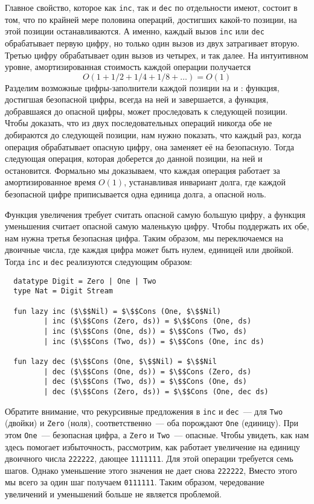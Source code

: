 Главное свойство, которое как \lstinline!inc!, так и \lstinline!dec!
по отдельности имеют, состоит в том, что по крайней мере половина
операций, достигших какой-то позиции, на этой позиции
останавливаются. А именно, каждый вызов \lstinline!inc! или
\lstinline!dec! обрабатывает первую цифру, но только один вызов из
двух затрагивает вторую. Третью цифру обрабатывает один вызов из
четырех, и так далее. На интуитивном уровне, амортизированная
стоимость каждой операции получается
$$
O(1 + 1/2 + 1/4 + 1/8 + \ldots) = O(1)
$$
Разделим возможные цифры-заполнители каждой позиции на
 и : функция,
достигшая безопасной цифры, всегда на ней и завершается, а функция,
добравшаяся до опасной цифры, может проследовать к следующей
позиции. Чтобы доказать, что из двух последовательных операций никогда
обе не добираются до следующей позиции, нам нужно показать, что каждый
раз, когда операция обрабатывает опасную цифру, она заменяет её на
безопасную. Тогда следующая операция, которая доберется до данной
позиции, на ней и остановится. Формально мы доказываем, что каждая
операция работает за амортизированное время $O(1)$, устанавливая
инвариант долга, где каждой безопасной цифре приписывается одна
единица долга, а опасной ноль.

Функция увеличения требует считать опасной самую большую цифру, а
функция уменьшения считает опасной самую маленькую цифру. Чтобы
поддержать их обе, нам нужна третья безопасная цифра. Таким образом,
мы переключаемся на  двоичные числа, где
каждая цифра может быть нулем, единицей или двойкой. Тогда
\lstinline!inc! и \lstinline!dec! реализуются следующим образом:
\begin{lstlisting}
  datatype Digit = Zero | One | Two
  type Nat = Digit Stream
  
  fun lazy inc ($\$$Nil) = $\$$Cons (One, $\$$Nil)
         | inc ($\$$Cons (Zero, ds)) = $\$$Cons (One, ds)
         | inc ($\$$Cons (One, ds)) = $\$$Cons (Two, ds)
         | inc ($\$$Cons (Two, ds)) = $\$$Cons (One, inc ds)

  fun lazy dec ($\$$Cons (One, $\$$Nil) = $\$$Nil
         | dec ($\$$Cons (One, ds)) = $\$$Cons (Zero, ds)
         | dec ($\$$Cons (Two, ds)) = $\$$Cons (One, ds)
         | dec ($\$$Cons (Zero, ds)) = $\$$Cons (One, dec ds)
\end{lstlisting}
Обратите внимание, что рекурсивные предложения в \lstinline!inc! и
\lstinline!dec!~--- для \lstinline!Two! (двойки) и \lstinline!Zero! (ноля),
соответственно~--- оба порождают \lstinline!One! (единицу). При этом
\lstinline!One!~--- безопасная цифра, а \lstinline!Zero! и
\lstinline!Two!~--- опасные. Чтобы увидеть, как нам здесь помогает
избыточность, рассмотрим, как работает увеличение на единицу двоичного
числа \texttt{222222}, дающее \texttt{1111111}. Для этой операции
требуется семь шагов. Однако уменьшение этого значения не дает снова
\texttt{222222}, Вместо этого мы всего за один шаг получаем
\texttt{0111111}. Таким образом, чередование увеличений и уменьшений
больше не является проблемой.

